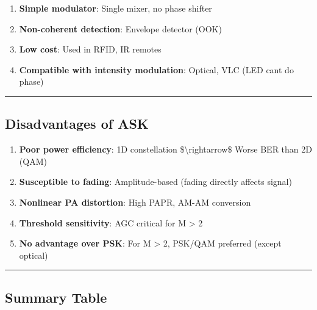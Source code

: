 \begin{enumerate}
\def\labelenumi{\arabic{enumi}.}
\tightlist
\item
  \textbf{Simple modulator}: Single mixer, no phase shifter
\item
  \textbf{Non-coherent detection}: Envelope detector (OOK)
\item
  \textbf{Low cost}: Used in RFID, IR remotes
\item
  \textbf{Compatible with intensity modulation}: Optical, VLC (LED
  can\textquotesingle t do phase)
\end{enumerate}

\begin{center}\rule{0.5\linewidth}{0.5pt}\end{center}

\subsection{Disadvantages of ASK}\label{disadvantages-of-ask}

\begin{enumerate}
\def\labelenumi{\arabic{enumi}.}
\tightlist
\item
  \textbf{Poor power efficiency}: 1D constellation
  \$\textbackslash rightarrow\$ Worse BER than 2D (QAM)
\item
  \textbf{Susceptible to fading}: Amplitude-based (fading directly
  affects signal)
\item
  \textbf{Nonlinear PA distortion}: High PAPR, AM-AM conversion
\item
  \textbf{Threshold sensitivity}: AGC critical for M \textgreater{} 2
\item
  \textbf{No advantage over PSK}: For M \textgreater{} 2, PSK/QAM
  preferred (except optical)
\end{enumerate}

\begin{center}\rule{0.5\linewidth}{0.5pt}\end{center}

\subsection{Summary Table}\label{summary-table}

